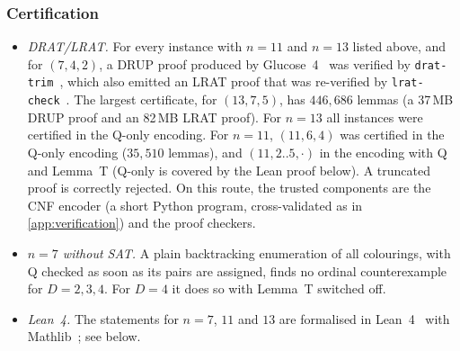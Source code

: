 \documentclass[11pt]{amsart}
\theoremstyle{definition}
\theoremstyle{remark}
\begin{document}
\subsubsection*{Certification}
\begin{itemize}[leftmargin=2em]
\item \emph{DRAT/LRAT.} For every instance with $n=11$ and $n=13$ listed above, and for $(7,4,2)$, a DRUP proof produced by Glucose~4~\cite{glucose} was verified by \texttt{drat-trim}~\cite{drattrim}, which also emitted an LRAT proof that was re-verified by \texttt{lrat-check}~\cite{lrat}. The largest certificate, for $(13,7,5)$, has $446{,}686$ lemmas (a 37\,MB DRUP proof and an 82\,MB LRAT proof). For $n=13$ all instances were certified in the Q-only encoding. For $n=11$, $(11,6,4)$ was certified in the Q-only encoding ($35{,}510$ lemmas), and $(11,2..5,\cdot)$ in the encoding with Q and Lemma~T (Q-only is covered by the Lean proof below). A truncated proof is correctly rejected. On this route, the trusted components are the CNF encoder (a short Python program, cross-validated as in \cref{app:verification}) and the proof checkers.
\item \emph{$n=7$ without SAT.} A plain backtracking enumeration of all colourings, with Q checked as soon as its pairs are assigned, finds no ordinal counterexample for $D=2,3,4$. For $D=4$ it does so with Lemma~T switched off.
\item \emph{Lean~4.} The statements for $n=7$, $11$ and $13$ are formalised in Lean~4~\cite{lean4} with Mathlib~\cite{mathlib}; see below.
\end{itemize}
\end{document}
